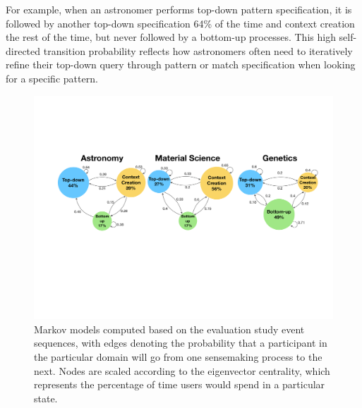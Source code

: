For example, when an astronomer performs top-down pattern specification,
it is followed by another top-down specification
64\% of the time and context creation the rest of the time,
but never followed by a bottom-up processes.
This high self-directed transition probability
reflects how astronomers often need to iteratively
refine their top-down query through pattern
or match specification when looking for a specific pattern. %
\begin{figure}[h!]
  \includegraphics[width=\linewidth]{figures/markov_transition.pdf}
  \caption{Markov models computed based on the evaluation study event sequences, with edges denoting the probability that a participant in the particular domain will go from one sensemaking process to the next. Nodes are scaled according to the eigenvector centrality, which represents the percentage of time users would spend in a particular state.}\label{fig:transition}
\end{figure}
